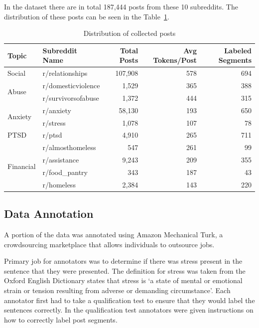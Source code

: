 \documentclass[10pt, a4paper]{article}
\begin{document}
In the dataset there are in total 187,444 posts from these 10 subreddits.
The distribution of these posts can be seen in the Table~\ref{tab:dataset-distribution}.

\begin{table}
    \caption{Distribution of collected posts}
    \label{tab:dataset-distribution}
    \begin{center}
        \begin{tabular}{|l|l|r|r|r|}
            \hline
            \textbf{Topic} & \textbf{Subreddit Name} & \textbf{Total Posts} & \textbf{Avg Tokens/Post} & \textbf{Labeled Segments}\\
            \hline
            Social                     & r/relationships    & 107,908 & 578 & 694 \\ \hline
            \multirow{2}{*}{Abuse}     & r/domesticviolence & 1,529   & 365 & 388 \\
                                       & r/survivorsofabuse & 1,372   & 444 & 315 \\ \hline
            \multirow{2}{*}{Anxiety}   & r/anxiety          & 58,130  & 193 & 650 \\
                                       & r/stress           & 1,078   & 107 & 78  \\ \hline
            PTSD                       & r/ptsd             & 4,910   & 265 & 711 \\ \hline
            \multirow{4}{*}{Financial} & r/almosthomeless   & 547     & 261 & 99  \\
                                       & r/assistance       & 9,243   & 209 & 355 \\
                                       & r/food\_pantry     & 343     & 187 & 43  \\
                                       & r/homeless         & 2,384   & 143 & 220 \\ \hline
        \end{tabular}
    \end{center}
\end{table}

\subsection{Data Annotation}

A portion of the data was annotated using Amazon Mechanical Turk, a crowdsourcing marketplace that allows individuals to outsource jobs.

Primary job for annotators was to determine if there was stress present in the sentence that they were presented.
The definition for stress was taken from the Oxford English Dictionary states that stress is `a state of mental or emotional strain or tension resulting from adverse or demanding circumstance'.
Each annotator first had to take a qualification test to ensure that they would label the sentences correctly.
In the qualification test annotators were given instructions on how to correctly label post segments.
\end{document}
